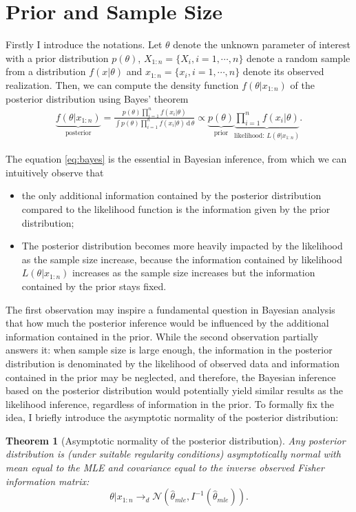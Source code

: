 \documentclass{article}
\numberwithin{equation}{section}
\theoremstyle{plain}
\newtheorem{theorem}{Theorem}
\begin{document}
\section{Prior and Sample Size}
\label{sec:prior}
Firstly I introduce the notations. Let $\theta$ denote the unknown parameter of interest with a prior distribution $p(\theta)$, $X_{1:n}=\{X_i,i=1,\cdots,n\}$ denote a random sample from a distribution $f(x|\theta)$ and $x_{1:n}=\{x_i,i=1,\cdots,n\}$ denote its observed realization. Then, we can compute the density function $f(\theta|x_{1:n})$ of the posterior distribution using Bayes’ theorem
\begin{align}\label{eq:bayes}
    \underbrace{f(\theta|x_{1:n})}_{\text{posterior}} =
    \frac{p(\theta)\prod^n_{i=1}f(x_i|\theta)}{\int p(\theta)\prod^n_{i=1}f(x_i|\theta)\,\mathrm{d}\,\theta} \propto \underbrace{p(\theta)}_{\text{prior}}
    \underbrace{\prod^n_{i=1}f(x_i|\theta)}_{\text{likelihood: }L(\theta|x_{1:n})}.
\end{align}

The equation \eqref{eq:bayes} is the essential in Bayesian inference, from which we can intuitively observe that
\begin{itemize}
    \item the only additional information contained by the posterior distribution compared to the likelihood function is the information given by the prior distribution;
    \item The posterior distribution becomes more heavily impacted by the likelihood as the sample size increase, because the information contained by likelihood $L(\theta|x_{1:n})$ increases as the sample size increases but the information contained by the prior stays fixed.
\end{itemize}
The first observation may inspire a fundamental question in Bayesian analysis that how much the posterior inference would be influenced by the additional information contained in the prior. While the second observation partially answers it: when sample size is large enough, the information in the posterior distribution is denominated by the likelihood of observed data and information contained in the prior may be neglected, and therefore, the Bayesian inference based on the posterior distribution would potentially yield similar results as the likelihood inference, regardless of information in the prior. To formally fix the idea, I briefly introduce the asymptotic normality of the posterior distribution:
\begin{theorem}[Asymptotic normality of the posterior distribution]\label{th:asy}
Any posterior distribution is (under suitable regularity conditions) asymptotically normal with mean equal to the MLE and covariance equal to the inverse observed Fisher information matrix:
$$
\theta|x_{1:n} \rightarrow_d \mathcal{N}\left(\hat{\theta}_{mle}, I^{-1}(\hat{\theta}_{mle})\right).
$$
\end{theorem}
\end{document}
